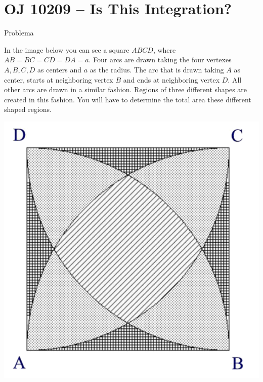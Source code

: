 \section{OJ 10209 -- Is This Integration?}

\begin{frame}[fragile]{Problema}

\begin{minipage}{0.45\textwidth}
In the image below you can see a square $ABCD$,
where $AB = BC = CD = DA = a$. Four arcs
are drawn taking the four vertexes $A, B, C, D$
as centers and $a$ as the radius. The arc that is
drawn taking $A$ as center, starts at neighboring
vertex $B$ and ends at neighboring vertex $D$. All
other arcs are drawn in a similar fashion. Regions of three different shapes are created in
this fashion. You will have to determine the
total area these different shaped regions.
\end{minipage}
\begin{minipage}{0.5\textwidth}
\begin{center}
\includegraphics[scale=0.75]{figure.png}
\end{center}
\end{minipage}

\end{frame}

